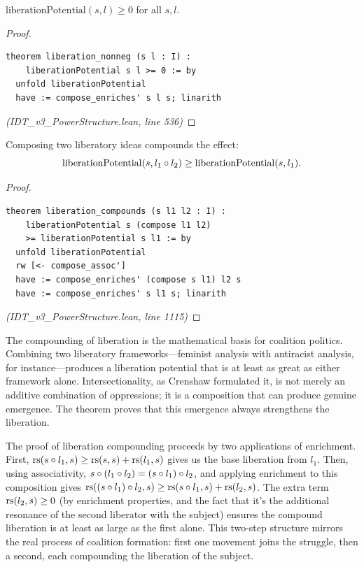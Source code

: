 \begin{theorem}
\label{thm:liberation-nonneg}
$\mathrm{liberationPotential}(s, l) \geq 0$ for all $s, l$.
\end{theorem}

\begin{proof}
\begin{lstlisting}
theorem liberation_nonneg (s l : I) :
    liberationPotential s l >= 0 := by
  unfold liberationPotential
  have := compose_enriches' s l s; linarith
\end{lstlisting}
\textit{(IDT\_v3\_PowerStructure.lean, line 536)}
\end{proof}

\begin{theorem}
\label{thm:liberation-compounds}
Composing two liberatory ideas compounds the effect:
\[
  \mathrm{liberationPotential}(s, l_1 \circ l_2)
  \geq \mathrm{liberationPotential}(s, l_1).
\]
\end{theorem}

\begin{proof}
\begin{lstlisting}
theorem liberation_compounds (s l1 l2 : I) :
    liberationPotential s (compose l1 l2)
    >= liberationPotential s l1 := by
  unfold liberationPotential
  rw [<- compose_assoc']
  have := compose_enriches' (compose s l1) l2 s
  have := compose_enriches' s l1 s; linarith
\end{lstlisting}
\textit{(IDT\_v3\_PowerStructure.lean, line 1115)}
\end{proof}

\begin{interpretation}
The compounding of liberation is the mathematical basis for coalition politics.
Combining two liberatory frameworks---feminist analysis with antiracist
analysis, for instance---produces a liberation potential that is at least as
great as either framework alone. Intersectionality, as Crenshaw formulated it,
is not merely an additive combination of oppressions; it is a composition that
can produce genuine emergence. The theorem proves that this emergence always
strengthens the liberation.
\end{interpretation}

\begin{remark}
The proof of liberation compounding proceeds by two applications of enrichment.
First, $\mathrm{rs}(s \circ l_1, s) \geq \mathrm{rs}(s,s) + \mathrm{rs}(l_1, s)$ gives us the
base liberation from $l_1$. Then, using associativity, $s \circ (l_1 \circ l_2)
= (s \circ l_1) \circ l_2$, and applying enrichment to this composition gives
$\mathrm{rs}((s \circ l_1) \circ l_2, s) \geq \mathrm{rs}(s \circ l_1, s) + \mathrm{rs}(l_2, s)$.
The extra term $\mathrm{rs}(l_2, s) \geq 0$ (by enrichment properties, and the fact that
it's the additional resonance of the second liberator with the subject)
ensures the compound liberation is at least as large as the first alone.
This two-step structure mirrors the real process of coalition formation:
first one movement joins the struggle, then a second, each compounding the
liberation of the subject.
\end{remark}

